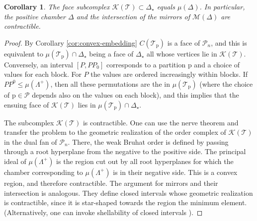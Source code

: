 \documentclass[reqno]{amsart}
\newcommand{\p}{\mathrm{p}}
\newcommand{\cM}{\mathcal{M}}
\newcommand{\cS}{\mathcal{S}}
\newcommand{\cT}{\mathcal{T}}
\newtheorem{corollary}[theorem]{Corollary}
\begin{document}
\begin{corollary}\label{cor:order-ideal}
The face subcomplex $\mathcal{K}(\cT)\subset \Delta_\star$ equals $\mu(\Delta)$. In particular, the positive chamber $\Delta$ and the intersection of the mirrors of $\cM(\Delta)$ are contractible.
\end{corollary}
\begin{proof}
 By Corollary \ref{cor:convex-embedding} $C(\cT_\p)$ is a face of $\mathcal{P}_n$, and this is equivalent to  $\mu(\cT_\p)\cap \Delta_\star$ being a face of $\Delta_\star$ all whose vertices lie in $\mathcal{K}(\cT)$. Conversely, an interval  $[P,PP_0]$ corresponds to a partition $\p$ and a choice of values for each block. For $P$ the values are ordered increasingly within blocks. If $PP^0\leq  \mu(\Lambda^+)$, then all these permutations are the in  $\mu(\cT_\p)$ (where the choice of $\p\in \mathcal{P}$ depends also on the values on each block), and this implies that the ensuing face of $\mathcal{K}(\cT)$ lies in $\mu(\cT_\p)\cap \Delta_\star$.

The subcomplex  $\mathcal{K}(\cT)$ is contractible. One can use the nerve theorem
and transfer the problem to the geometric realization of the order complex of $\mathcal{K}(\cT)$ in  the dual fan of $\mathcal{P}_n$. There, the weak  Bruhat order is defined by passing through a root hyperplane from the negative to the positive side. The principal ideal of  $\mu(\Lambda^+)$ is the region cut out by all root hyperplanes for which the chamber corresponding to  $\mu(\Lambda^+)$ is in their negative side. This is a convex region, and therefore contractible. The argument for mirrors and their intersection is analogous. They define closed intervals  whose geometric realization is contractible, since it is star-shaped towards the region the minimum element. (Alternatively, one can invoke shellability of closed intervals \cite{BW}).
%
\end{proof}
\end{document}
